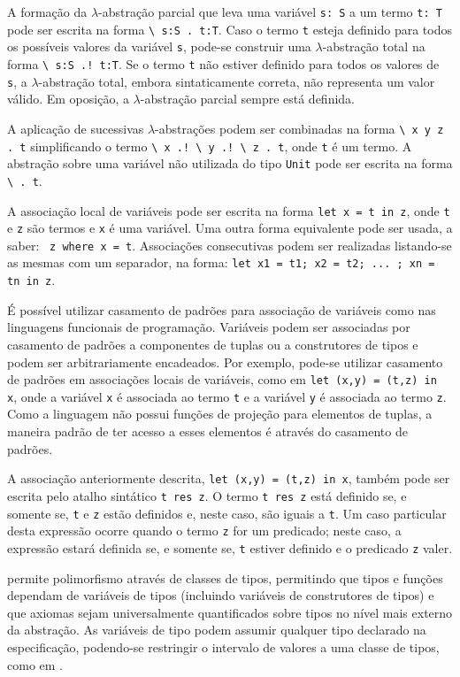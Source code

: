 A formação da $\lambda$-abstração parcial que leva uma variável \Verb.s: S. a um termo \Verb.t: T. pode ser escrita na forma \Verb_\ s:S . t:T_.
Caso o termo \Verb.t. esteja definido para todos os possíveis valores da variável \Verb.s., pode-se construir uma $\lambda$-abstração total na forma \Verb_\ s:S .! t:T_.
Se o termo \Verb.t. não estiver definido para todos os valores de \Verb.s., a $\lambda$-abstração total, embora sintaticamente correta, não representa um valor válido.
Em oposição, a $\lambda$-abstração parcial sempre está definida.

A aplicação de sucessivas $\lambda$-abstrações podem ser combinadas na forma \Verb_\ x y z . t_ simplificando o termo \Verb_\ x .! \ y .! \ z . t_, onde \Verb.t. é um termo.
A abstração sobre uma variável não utilizada do tipo \Verb.Unit. pode ser escrita na forma \Verb_\ . t_.

A associação local de variáveis pode ser escrita na forma \Verb.let x = t in z., onde \Verb.t. e \Verb.z. são termos e \Verb.x. é uma variável.
Uma outra forma equivalente pode ser usada, a saber: \Verb. z where x = t..
Associações consecutivas podem ser realizadas listando-se as mesmas com um separador, na forma: \Verb_let x1 = t1; x2 = t2; ... ; xn = tn in z_.

É possível utilizar casamento de padrões para associação de variáveis como nas linguagens funcionais de programação.
Variáveis podem ser associadas por casamento de padrões a componentes de tuplas ou a construtores de tipos e podem ser arbitrariamente encadeados.
Por exemplo, pode-se utilizar casamento de padrões em associações locais de variáveis, como em \Verb_let (x,y) = (t,z) in x_, onde a variável \Verb.x. é associada ao termo \Verb.t. e a variável \Verb.y. é associada ao termo \Verb.z..
Como a linguagem não possui funções de projeção para elementos de tuplas, a maneira padrão de ter acesso a esses elementos é através do casamento de padrões.

A associação anteriormente descrita, \Verb_let (x,y) = (t,z) in x_, também pode ser escrita pelo atalho sintático \Verb.t res z..
O termo \Verb.t res z. está definido se, e somente se, \Verb.t. e \Verb.z. estão definidos e, neste caso, são iguais a \Verb.t..
Um caso particular desta expressão ocorre quando o termo \Verb.z. for um predicado; neste caso, a expressão estará definida se, e somente se, \Verb.t. estiver definido e o predicado \Verb.z. valer.

\HasCASL permite polimorfismo através de classes de tipos, permitindo que tipos e funções dependam de variáveis de tipos (incluindo variáveis de construtores de tipos) e que axiomas sejam universalmente quantificados sobre tipos no nível mais externo da abstração.
As variáveis de tipo podem assumir qualquer tipo declarado na especificação, podendo-se restringir o intervalo de valores a uma classe de tipos, como em \Haskell.

